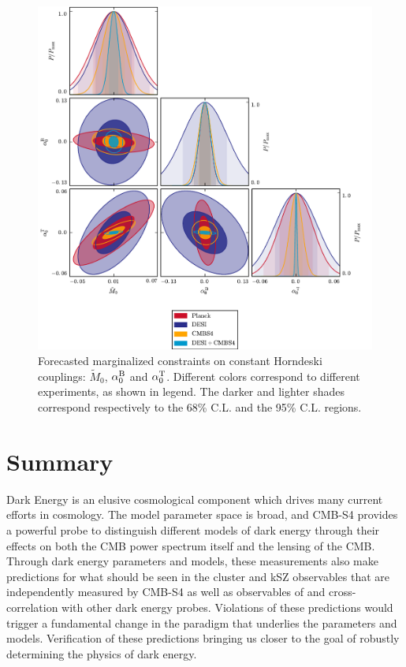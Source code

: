 \begin{figure}[!tb]
\begin{center}
\includegraphics[width=1.0\textwidth]{DarkEnergy/7_Const_alpha}
\caption{Forecasted marginalized constraints on constant Horndeski couplings: $\tilde{M}_{0}$, $\alpha^{\rm B}_0$ and $\alpha_0^{\rm T}$. Different colors correspond to different experiments, as shown in legend. The darker and lighter shades correspond respectively to the 68\% C.L. and the 95\% C.L. regions.}\label{fig:ConstantAlpha}
\end{center}
\end{figure}

\section{Summary}
Dark Energy is an elusive cosmological component which drives many current efforts in cosmology. The model parameter space is broad, and CMB-S4 provides a powerful probe to distinguish different models of dark energy through their effects on both the CMB power spectrum itself and the lensing of the CMB.
Through dark energy parameters and models, these measurements also make predictions for what should be seen in the cluster and kSZ observables 
that are independently measured by CMB-S4 as well as observables of and cross-correlation with other dark energy probes.   
Violations of these predictions would trigger a fundamental change in the paradigm that underlies
the parameters and models.  Verification of these predictions bringing us closer to the goal of 
robustly determining the physics of dark energy.

%



